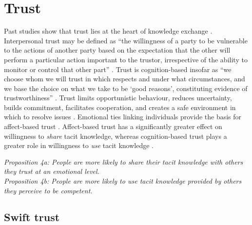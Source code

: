 \section{Trust}

Past studies show that trust lies at the heart of knowledge exchange \citep[e.g.][]{nonaka1994dynamic,davenport1998working,hsu2007knowledge,wang2016examining}. Interpersonal trust may be defined as \enquote{the willingness of a party to be vulnerable to the actions of another party based on the expectation that the other will perform a particular action important to the trustor, irrespective of the ability to monitor or control that other part} \citep{mayer1995integrative}. Trust is cognition-based insofar as \enquote{we choose whom we will trust in which respects and under what circumstances, and we base the choice on what we take to be \enquote{good reasons}, constituting evidence of trustworthiness} \citep{lewis1985trust}. Trust limits opportunistic behaviour, reduces uncertainty, builds commitment, facilitates cooperation, and creates a safe environment in which to resolve issues \citep{nonaka1994dynamic,panteli2005trust,rasmussen2007work}. Emotional ties linking individuals provide the basis for affect-based trust \citep{mcallister1995affect}. Affect-based trust has a significantly greater effect on willingness to \emph{share} tacit knowledge, whereas cognition-based trust plays a greater role in willingness to \emph{use} tacit knowledge \citep{levin2004strength,holste2010trust,ding2015research}. \medskip

\begin{tcolorbox}
\emph{Proposition 4a: People are more likely to share their tacit knowledge with others they trust at an emotional level.} \\
\emph{Proposition 4b: People are more likely to use tacit knowledge provided by others they perceive to be competent.}
\end{tcolorbox}

\subsection{Swift trust}

